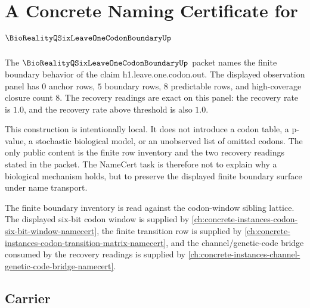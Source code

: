 \chapter{A Concrete Naming Certificate for $\BioRealityQSixLeaveOneCodonBoundaryUp$}
\label{ch:concrete-instances-bioreality_q_six_leave_one_codon_boundary-namecert}

The $\BioRealityQSixLeaveOneCodonBoundaryUp$ packet names the finite boundary behavior of the claim h1.leave.one.codon.out. The displayed observation panel has $0$ anchor rows, $5$ boundary rows, $8$ predictable rows, and high-coverage closure count $8$. The recovery readings are exact on this panel: the recovery rate is $1.0$, and the recovery rate above threshold is also $1.0$.

This construction is intentionally local. It does not introduce a codon table, a p-value, a stochastic biological model, or an unobserved list of omitted codons. The only public content is the finite row inventory and the two recovery readings stated in the packet. The NameCert task is therefore not to explain why a biological mechanism holds, but to preserve the displayed finite boundary surface under name transport.

The finite boundary inventory is read against the codon-window sibling lattice. The displayed six-bit codon window is supplied by \autoref{ch:concrete-instances-codon-six-bit-window-namecert}, the finite transition row is supplied by \autoref{ch:concrete-instances-codon-transition-matrix-namecert}, and the channel/genetic-code bridge consumed by the recovery readings is supplied by \autoref{ch:concrete-instances-channel-genetic-code-bridge-namecert}.

\section{Carrier}
\label{sec:bioreality-q-six-leave-one-codon-boundary-carrier}

